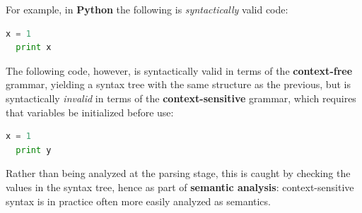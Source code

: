 \documentclass{beamer}
\begin{document}
\begin{frame}[fragile]
  For example, in \textbf{Python} the following is \textit{syntactically} valid
  code:

  \begin{lstlisting}[language=python]
  x = 1
  print x \end{lstlisting}

  The following code, however, is syntactically valid in terms of the
  \textbf{context-free} grammar, yielding a syntax tree with the same structure
  as the previous, but is syntactically \textit{invalid} in terms of the
  \textbf{context-sensitive} grammar, which requires that variables be
  initialized before use:

  \begin{lstlisting}[language=python]
  x = 1
  print y \end{lstlisting}

  Rather than being analyzed at the parsing stage, this is caught by checking
  the values in the syntax tree, hence as part of \textbf{semantic analysis}:
  context-sensitive syntax is in practice often more easily analyzed as
  semantics.
\end{frame}
\end{document}
